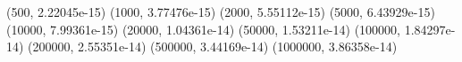 (500, 2.22045e-15) (1000, 3.77476e-15) (2000, 5.55112e-15) (5000, 6.43929e-15) (10000, 7.99361e-15) (20000, 1.04361e-14) (50000, 1.53211e-14) (100000, 1.84297e-14) (200000, 2.55351e-14) (500000, 3.44169e-14) (1000000, 3.86358e-14) 